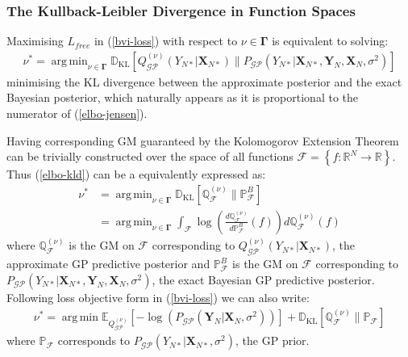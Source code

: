 \documentclass{article}
\newcommand{\KLD}{\operatorname{\mathbb{D}_{KL}}}
\newcommand{\GP}{\operatorname{\mathcal{GP}}}
\DeclareMathOperator*{\argmin}{arg\,min}
\numberwithin{equation}{section}
\begin{document}
\subsubsection{The Kullback-Leibler Divergence in Function Spaces}
Maximising $L_{free}$ in (\ref{bvi-loss}) with respect to $\nu \in \mathbf{\Gamma}$ is equivalent to solving:
\begin{align}
    \nu^* = \argmin_{\nu \in \mathbf{\Gamma}}\KLD \left[ Q_{\GP}^{(\nu)}\left(Y_{N*} \vert \mathbf{X}_{N*}\right) \Big\| P_{\GP}\left(Y_{N*} \vert \mathbf{X}_{N*}, \mathbf{Y}_N, \mathbf{X}_N, \sigma^2 \right) \right]
    \label{elbo-kld}
\end{align}
minimising the KL divergence between the approximate posterior and the exact Bayesian posterior, which naturally appears as it is proportional to the numerator of (\ref{elbo-jensen}). 

Having corresponding GM guaranteed by the Kolomogorov Extension Theorem can be trivially constructed over the space of all functions $\mathcal{F} = \left\{f: \mathbb{R}^{N} \rightarrow \mathbb{R} \right\}$. Thus (\ref{elbo-kld}) can be a equivalently expressed as:
\begin{align}
    \label{kld-function-spaces}
    \nu^* &= \argmin_{\nu \in \mathbf{\Gamma}} \KLD\left[ \mathbb{Q}^{(\nu)}_\mathcal{F} \| \mathbb{P}^B_\mathcal{F} \right] \\
    &= \argmin_{\nu \in \mathbf{\Gamma}} \int_{\mathcal{F}} \log \left( \frac{d \mathbb{Q}^{(\nu)}_\mathcal{F}}{d \mathbb{P}^B_\mathcal{F}} (f)\right)d \mathbb{Q}^{(\nu)}_\mathcal{F}(f)
    \label{radon-nikodym}
\end{align}
where $\mathbb{Q}^{(\nu)}_\mathcal{F}$ is the GM on $\mathcal{F}$ corresponding to $Q_{\GP}^{(\nu)}\left(Y_{N*} \vert \mathbf{X}_{N*}\right)$, the approximate GP predictive posterior and $\mathbb{P}^B_\mathcal{F}$ is the GM on $\mathcal{F}$ corresponding to $P_{\GP}\left(Y_{N*} \vert \mathbf{X}_{N*}, \mathbf{Y}_N, \mathbf{X}_N, \sigma^2 \right)$, the exact Bayesian GP predictive posterior. Following loss objective form in (\ref{bvi-loss}) we can also write:
\begin{align}
    \nu^* = \argmin \mathbb{E}_{Q^{(\nu)}_{\GP}}\left[-\log \left(P_{\GP}\left(\mathbf{Y}_N \vert \mathbf{X}_{N}, \sigma^2\right)\right)\right] + \KLD \left[\mathbb{Q}^{(\nu)}_{\mathcal{F}} \| \mathbb{P}_{\mathcal{F}} \right]
    \label{bvi-gm-loss}
\end{align}
where $\mathbb{P}_\mathcal{F}$ corresponds to $P_{\GP}\left(Y_{N*} \vert \mathbf{X}_{N*}, \sigma^2 \right)$, the GP prior.
\end{document}
